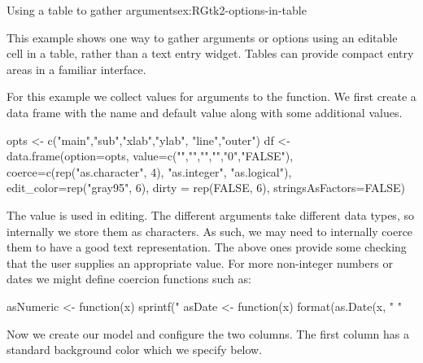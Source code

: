 \begin{example}{Using a table to gather arguments}{ex:RGtk2-options-in-table}

This example shows one way to gather arguments or options using an
editable cell in a table, rather than a text entry widget. Tables can
provide compact entry areas in a familiar interface.

For this example we collect values for arguments to the
 function. We first create a data frame with the name
and default value along with some additional values.

\begin{Schunk}
\begin{Sinput}
 opts <- c("main","sub","xlab","ylab", "line","outer")
 df <- data.frame(option=opts,
                  value=c("","","","","0","FALSE"),
                  coerce=c(rep("as.character", 4), 
                    "as.integer", "as.logical"),
                  edit_color=rep("gray95", 6),
                  dirty = rep(FALSE, 6),
                  stringsAsFactors=FALSE)
\end{Sinput}
\end{Schunk}
%

The  value is used in editing. The different arguments
take different data types, so internally we store them as
characters. As such, we may need to internally coerce them to have a
good text representation. The above ones provide some checking that
the user supplies an appropriate value. For more non-integer numbers or
dates we might define coercion functions such as:
\begin{Schunk}
\begin{Sinput}
 asNumeric <- function(x) sprintf("%
 asDate <- function(x)  format(as.Date(x, "%
                               "%
\end{Sinput}
\end{Schunk}
%

Now we create our model and configure the two columns. The first
column has a standard background color which we specify below.
\begin{Schunk}
\end{Schunk}


\end{example}
